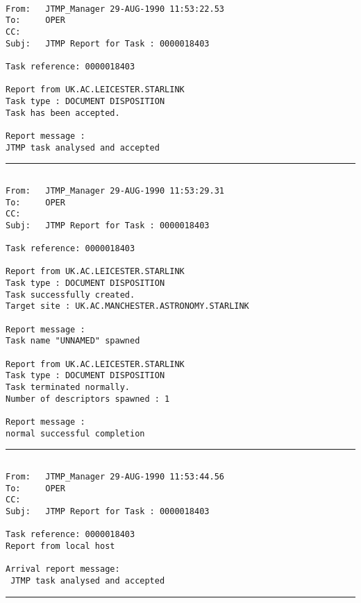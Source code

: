 \begin{verbatim}

From:   JTMP_Manager 29-AUG-1990 11:53:22.53
To:     OPER        
CC:
Subj:   JTMP Report for Task : 0000018403

Task reference: 0000018403

Report from UK.AC.LEICESTER.STARLINK
Task type : DOCUMENT DISPOSITION
Task has been accepted.

Report message : 
JTMP task analysed and accepted

\end{verbatim}
\rule{\textwidth}{0.5mm}
\begin{verbatim}

From:   JTMP_Manager 29-AUG-1990 11:53:29.31
To:     OPER        
CC:
Subj:   JTMP Report for Task : 0000018403

Task reference: 0000018403

Report from UK.AC.LEICESTER.STARLINK
Task type : DOCUMENT DISPOSITION
Task successfully created.
Target site : UK.AC.MANCHESTER.ASTRONOMY.STARLINK

Report message : 
Task name "UNNAMED" spawned

Report from UK.AC.LEICESTER.STARLINK
Task type : DOCUMENT DISPOSITION
Task terminated normally.
Number of descriptors spawned : 1

Report message : 
normal successful completion

\end{verbatim}
\rule{\textwidth}{0.5mm}
\begin{verbatim}

From:   JTMP_Manager 29-AUG-1990 11:53:44.56
To:     OPER        
CC:
Subj:   JTMP Report for Task : 0000018403

Task reference: 0000018403
Report from local host

Arrival report message:
 JTMP task analysed and accepted

\end{verbatim}
\rule{\textwidth}{0.5mm}


